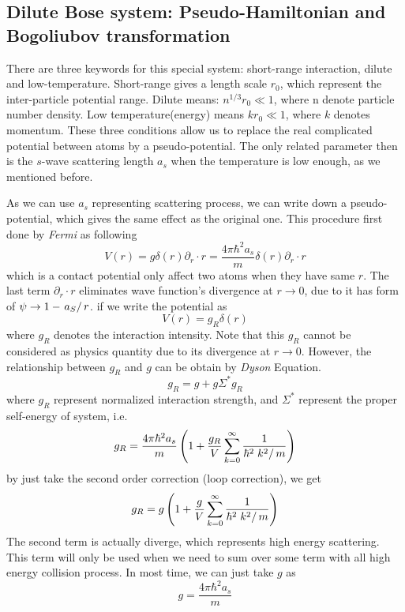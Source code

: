 \subsection{Dilute Bose system: Pseudo-Hamiltonian and Bogoliubov transformation}

There are three keywords for this special system: short-range interaction, dilute and low-temperature. Short-range gives a length scale $r_0$, which represent the inter-particle potential range. Dilute means: $n^{1/3}r_0 \ll 1$, where n denote particle number density. Low temperature(energy) means $k r_0 \ll 1$, where $k$ denotes momentum. These three conditions allow us to replace the real complicated potential between atoms by a pseudo-potential. The only related parameter then is the $s$-wave scattering length $a_s$ when the temperature is low enough, as we mentioned before.

As we can use $a_s$ representing scattering process, we can write down a pseudo-potential, which gives the same effect as the original one. This procedure first done by \textit{Fermi} as following
\begin{equation}
V(r)=g \delta (r)\partial _r\cdot r=\frac{4\pi\hbar^2a_s}{m}\delta (r)\partial _r\cdot r
\end{equation}
which is a contact potential only affect two atoms when they have same $r$. The last term $\partial _r\cdot r$ eliminates wave function's divergence at $r\to 0$, due to it has form of $\psi \to 1-\left.a_S\right/r$. if we write the potential as
\begin{equation}
V(r)=g_R\delta (r)
\end{equation}
where $g_R$ denotes the interaction intensity. Note that this $g_R$ cannot be considered as physics quantity due to its divergence at $r\to 0$. However, the relationship between $g_R$ and $g$ can be obtain by \textit{Dyson} Equation.
\begin{equation}
g_R=g+g \Sigma ^* g_R
\end{equation}
where $g_R$ represent normalized interaction strength, and $\Sigma^*$ represent the proper self-energy of system, i.e.
\begin{equation}
g_R=\frac{4\pi  \hbar ^2a_s}{m}\left(1+\frac{g_R}{V}\sum _{k=0}^{\infty } \frac{1}{\hbar ^2\left.k^2\right/m}\right)
\end{equation}
by just take the second order correction (loop correction), we get
\begin{equation}
\label{gRRe}
g_R=g\left(1+\frac{g}{V}\sum _{k=0}^{\infty } \frac{1}{\hbar ^2\left.k^2\right/m}\right)
\end{equation}
The second term is actually diverge, which represents high energy scattering. This term will only be used when we need to sum over some term with all high energy collision process. In most time, we can just take $g$ as
\begin{equation}
g=\frac{4\pi  \hbar ^2a_s}{m}
\end{equation}

